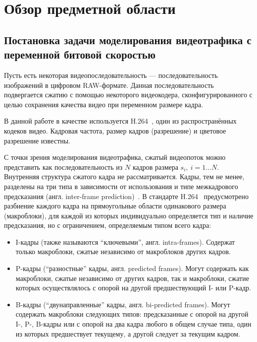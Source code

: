 \section{Обзор предметной области}
\subsection{Постановка задачи моделирования видеотрафика
с переменной битовой скоростью}

Пусть есть некоторая видеопоследовательность ---
последовательность изображений в цифровом RAW-формате.
Данная последовательность подвергается сжатию с помощью
некоторого видеокодера, сконфигурированного с целью
сохранения качества видео при переменном размере кадра.

В данной работе в качестве
используется H.264~\cite{}, один из распространённых
кодеков видео. Кадровая частота, размер кадров (разрешение)
и цветовое разрешение известны.

С точки зрения моделирования видеотрафика, сжатый видеопоток
можно представить как последовательность из $N$ кадров
размера $s_i,~i=1\dots N$. Внутренняя структура сжатого
кадра не рассматривается. Кадры, тем не менее, разделены
на три типа в зависимости от использования и типе межкадрового
предсказания (англ. inter-frame prediction)~\cite{}.
В стандарте H.264~\cite{} предусмотрено разбиение каждого
кадра на прямоугольные области одинакового размера (макроблоки),
для каждой из которых индивидуально определяется тип и наличие
предсказания, но с ограничением, определяемым типом всего кадра:

\begin{itemize}
    \item I-кадры (также называются ``ключевыми'', англ. intra-frames).
        Содержат только макроблоки, сжатые независимо от макроблоков
        других кадров.
    \item P-кадры (``разностные'' кадры, англ. predicted frames).
        Могут содержать как макроблоки, сжатые независимо от других
        кадров, так и макроблоки, сжатие которых осуществлялось с
        опорой на другой предшествующий I- или P-кадр.
    \item B-кадры (``двунаправленные'' кадры, англ. bi-predicted frames).
        Могут содержать макроблоки следующих типов: предсказанные с опорой
        на другой I-, P-, B-кадры или с опорой на два кадра любого в
        общем случае типа, один из которых предшествует текущему,
        а другой следует за текущим кадром.
\end{itemize}

